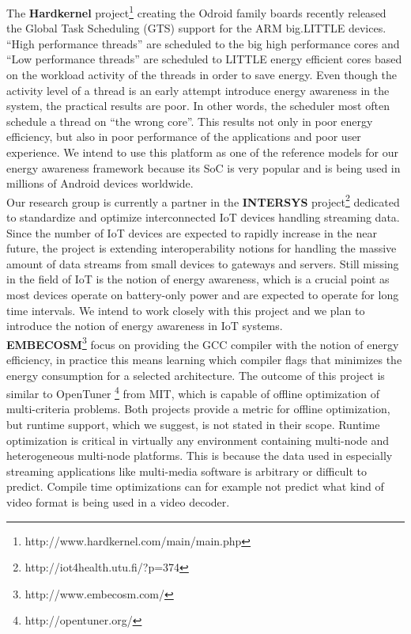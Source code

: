\documentclass{article}
\begin{document}
The \textbf{Hardkernel} project\footnote{http://www.hardkernel.com/main/main.php} creating the Odroid family boards recently released the Global Task Scheduling (GTS) support for the ARM big.LITTLE devices. “High performance threads” are scheduled to the big high performance cores and “Low performance threads” are scheduled to LITTLE energy efficient cores based on the workload activity of the threads in order to save energy. Even though the activity level of a thread is an early attempt introduce energy awareness in the system, the practical results are poor. In other words, the scheduler most often schedule a thread on “the wrong core”. This results not only in poor energy efficiency, but also in poor performance of the applications and poor user experience. We intend to use this platform as one of the reference models for our energy awareness framework because its SoC is very popular and is being used in millions of Android devices worldwide.\\

Our research group is currently a partner in the \textbf{INTERSYS} project\footnote{http://iot4health.utu.fi/?p=374} dedicated to standardize and optimize interconnected IoT devices handling streaming data. Since the number of IoT devices are expected to rapidly increase in the near future, the project is extending interoperability notions for handling the massive amount of data streams from small devices to gateways and servers. Still missing in the field of IoT is the notion of energy awareness, which is a crucial point as most devices operate on battery-only power and are expected to operate for long time intervals. We intend to work closely with this project and we plan to introduce the notion of energy awareness in IoT systems.\\

\textbf{EMBECOSM}\footnote{http://www.embecosm.com/} focus on providing the GCC compiler with the notion of energy efficiency, in practice this means learning which compiler flags that minimizes the energy consumption for a selected architecture. The outcome of this project is similar to OpenTuner \footnote{http://opentuner.org/} from MIT, which is capable of offline optimization of multi-criteria problems. Both projects provide a metric for offline optimization, but runtime support, which we suggest, is not stated in their scope. Runtime optimization is critical in virtually any environment containing multi-node and heterogeneous multi-node platforms. This is because the data used in especially streaming applications like multi-media software is arbitrary or difficult to predict. Compile time optimizations can for example not predict what kind of video format is being used in a video decoder.\\
\end{document}

